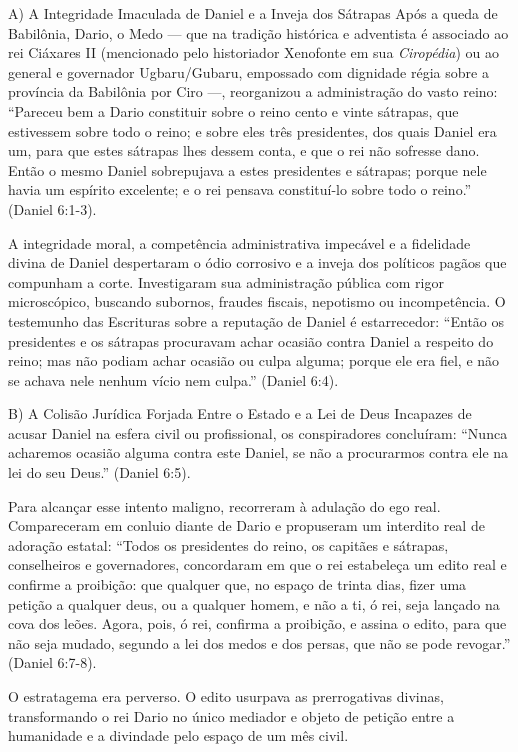 A) A Integridade Imaculada de Daniel e a Inveja dos Sátrapas
Após a queda de Babilônia, Dario, o Medo — que na tradição histórica e adventista é associado ao rei Ciáxares II (mencionado pelo historiador Xenofonte em sua \textit{Ciropédia}) ou ao general e governador Ugbaru/Gubaru, empossado com dignidade régia sobre a província da Babilônia por Ciro —, reorganizou a administração do vasto reino:
``Pareceu bem a Dario constituir sobre o reino cento e vinte sátrapas, que estivessem sobre todo o reino; e sobre eles três presidentes, dos quais Daniel era um, para que estes sátrapas lhes dessem conta, e que o rei não sofresse dano. Então o mesmo Daniel sobrepujava a estes presidentes e sátrapas; porque nele havia um espírito excelente; e o rei pensava constituí-lo sobre todo o reino.'' (Daniel 6:1-3).

A integridade moral, a competência administrativa impecável e a fidelidade divina de Daniel despertaram o ódio corrosivo e a inveja dos políticos pagãos que compunham a corte. Investigaram sua administração pública com rigor microscópico, buscando subornos, fraudes fiscais, nepotismo ou incompetência. O testemunho das Escrituras sobre a reputação de Daniel é estarrecedor:
``Então os presidentes e os sátrapas procuravam achar ocasião contra Daniel a respeito do reino; mas não podiam achar ocasião ou culpa alguma; porque ele era fiel, e não se achava nele nenhum vício nem culpa.'' (Daniel 6:4).

B) A Colisão Jurídica Forjada Entre o Estado e a Lei de Deus
Incapazes de acusar Daniel na esfera civil ou profissional, os conspiradores concluíram:
``Nunca acharemos ocasião alguma contra este Daniel, se não a procurarmos contra ele na lei do seu Deus.'' (Daniel 6:5).

Para alcançar esse intento maligno, recorreram à adulação do ego real. Compareceram em conluio diante de Dario e propuseram um interdito real de adoração estatal:
``Todos os presidentes do reino, os capitães e sátrapas, conselheiros e governadores, concordaram em que o rei estabeleça um edito real e confirme a proibição: que qualquer que, no espaço de trinta dias, fizer uma petição a qualquer deus, ou a qualquer homem, e não a ti, ó rei, seja lançado na cova dos leões. Agora, pois, ó rei, confirma a proibição, e assina o edito, para que não seja mudado, segundo a lei dos medos e dos persas, que não se pode revogar.'' (Daniel 6:7-8).

O estratagema era perverso. O edito usurpava as prerrogativas divinas, transformando o rei Dario no único mediador e objeto de petição entre a humanidade e a divindade pelo espaço de um mês civil.

